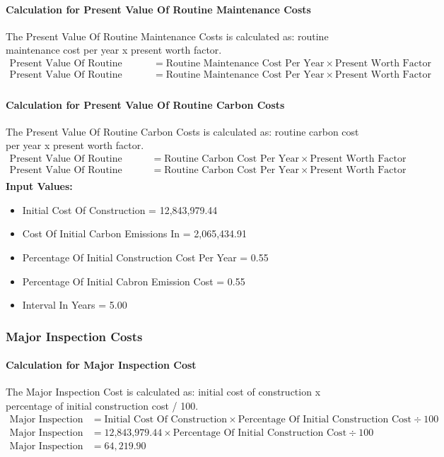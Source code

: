 \documentclass{article}
\begin{document}
 \paragraph{Calculation for Present Value Of Routine Maintenance Costs} 
The Present Value Of Routine Maintenance Costs is calculated as: routine maintenance cost per year x present worth factor.
\begin{align*}
 \text{Present Value Of Routine Maintenance Costs} &= \text{Routine Maintenance Cost Per Year} \times \text{Present Worth Factor} \\
 \text{Present Value Of Routine Maintenance Costs} &= \text{Routine Maintenance Cost Per Year} \times \text{Present Worth Factor} \\
\end{align*}
 \paragraph{Calculation for Present Value Of Routine Carbon Costs} 
The Present Value Of Routine Carbon Costs is calculated as: routine carbon cost per year x present worth factor.
\begin{align*}
 \text{Present Value Of Routine Carbon Costs} &= \text{Routine Carbon Cost Per Year} \times \text{Present Worth Factor} \\
 \text{Present Value Of Routine Carbon Costs} &= \text{Routine Carbon Cost Per Year} \times \text{Present Worth Factor} \\
\end{align*}
\textbf{Input Values:}
\begin{itemize}
\item Initial Cost Of Construction = 12,843,979.44
\item Cost Of Initial Carbon Emissions In = 2,065,434.91
\item Percentage Of Initial Construction Cost Per Year = 0.55
\item Percentage Of Initial Cabron Emission Cost = 0.55
\item Interval In Years = 5.00
\end{itemize}
\subsubsection{Major Inspection Costs}
 \paragraph{Calculation for Major Inspection Cost} 
The Major Inspection Cost is calculated as: initial cost of construction x percentage of initial construction cost / 100.
\begin{align*}
 \text{Major Inspection Cost} &= \text{Initial Cost Of Construction} \times \text{Percentage Of Initial Construction Cost} \div 100 \\
 \text{Major Inspection Cost} &= \text{12,843,979.44} \times \text{Percentage Of Initial Construction Cost} \div 100 \\
 \text{Major Inspection Cost} &= 64,219.90 
\end{align*}
\end{document}
